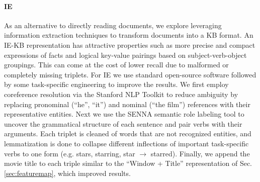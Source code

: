 \paragraph{IE} As an alternative to directly reading documents,
we explore leveraging information extraction  techniques to
transform documents into a KB format.
An IE-KB representation has attractive properties
such as more precise and compact expressions of facts
and logical key-value pairings based on subject-verb-object groupings.
This can come at the cost of lower recall due to malformed or completely missing triplets.
%
For IE we use standard open-source software followed by some task-specific
engineering to improve the results.
We first employ coreference resolution via the Stanford NLP Toolkit \citep{manning2014stanford} to reduce ambiguity by replacing pronominal (``he'', ``it'') and nominal (``the film'') references with their representative entities. Next we use the SENNA semantic role labeling tool \citep{senna_collobert} to uncover the grammatical structure of each sentence and pair verbs with their arguments. Each triplet is cleaned of words that are not recognized entities,
and lemmatization is done to collapse different inflections of important task-specific verbs to one form (e.g. stars, starring, star $\rightarrow$ starred).
Finally, we append the movie title to each triple similar to the ``Window + Title''
representation of Sec. \ref{sec:featuremap}, which improved results.


